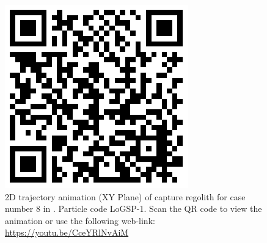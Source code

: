 \begin{figure}[htb]
\centering
\captionsetup{justification=centering}
\includegraphics[scale=0.25]{longest_edge_perturbations/3.2Density_1cmSize/qrcode_8ms_165Azimuth_45SolarPhase.png}
\caption{2D trajectory animation (XY Plane) of capture regolith for case number 8 in . Particle code LoGSP-1. Scan the QR code to view the animation or use the following web-link: \url{https://youtu.be/CceYRlNvAiM}}
\label{fig:LoGSP_1_capture_case_8_2d_trajectory_animation}
\end{figure}
\FloatBarrier

